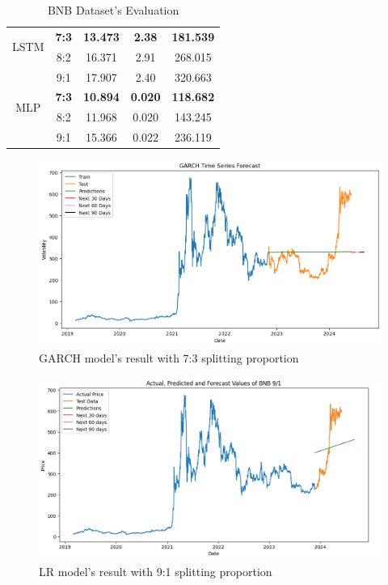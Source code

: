 \documentclass{ieeeojies}
\begin{document}
\begin{table}[H]
\begin{tabular}{|c|c|c|c|c|}
    \hline
    \multirow{2}{*}{LSTM}  & \textbf{7:3}     & \textbf{13.473}  & \textbf{2.38}   & \textbf{181.539}   \\ & 8:2 & 16.371 & 2.91 &  268.015 \\ & 9:1 & 17.907 &	2.40 & 320.663\\
    \hline
    \multirow{2}{*}{MLP}   & \textbf{7:3}     & \textbf{10.894}  & \textbf{0.020}  & \textbf{118.682}   \\ & 8:2 & 11.968 & 0.020 &  143.245 \\ & 9:1 & 15.366 & 0.022 & 236.119\\
    \hline
  \end{tabular}
  \caption{BNB Dataset's Evaluation}
  \label{mbbresult}
\end{table}
\vspace{-10mm}
\begin{figure}[H]
  \centering
  \begin{minipage}{0.8\linewidth}
    \centering
    \includegraphics[width=\linewidth]{Image/Garch/GARCH_BNB73.png}
    \caption{GARCH model's result with 7:3 splitting proportion}
    \label{fig:15}
  \end{minipage}
\end{figure}
\vspace{-5mm}
\begin{figure}[H]
  \centering
  \begin{minipage}{0.8\linewidth}
    \centering
    \includegraphics[width=\linewidth]{Image/LN/LN_BNB_91.png}
    \caption{LR model's result with 9:1 splitting proportion}
    \label{fig:16}
  \end{minipage}
\end{figure}
\end{document}
